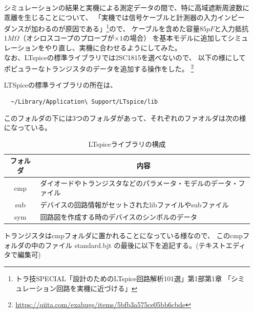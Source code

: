 \documentclass[uplatex,a4paper,11pt,oneside,openany]{jsbook}
\begin{document}
シミュレーションの結果と実機による測定データの間で、特に高域遮断周波数に乖離を生じることについて、
「実機では信号ケーブルと計測器の入力インピーダンスが加わるのが原因である」\footnote{トラ技SPECIAL「設計のためのLTspice回路解析101選」第1部第1章
「シミュレーション回路を実機に近づける」}ので、
ケーブルを含めた容量$85pF$と入力抵抗$1M\Omega$（オシロスコープのプローブが$\times 1$の場合）
を基本モデルに追加してシミュレーションをやり直し、実機に合わせるようにしてみた。\\

なお、LTspiceの標準ライブラリでは2SC1815を選べないので、
以下の様にしてポピュラーなトランジスタのデータを追加する操作をした。
\footnote{\url{https://qiita.com/exabugs/items/5bfb3a575ce05bb6cbde}}

LTSpiceの標準ライブラリの所在は、
\begin{verbatim}
  ~/Library/Application\ Support/LTspice/lib
\end{verbatim}
このフォルダの下には3つのフォルダがあって、それぞれのファオルダは次の様になっている。
\begin{table}[H]
  \begin{center}
  \caption{LTspiceライブラリの構成}
  \begin{tabular}{|c|l|} \hline
    \multicolumn{1}{|c|}{\textbf{フォルダ}} & \multicolumn{1}{c|}{\textbf{内容}} \\ \hline\hline
    cmp & ダイオードやトランジスタなどのパラメータ・モデルのデータ・ファイル \\ \hline
    sub & デバイスの回路情報がセットされたlibファイルやsubファイル \\ \hline
    sym & 回路図を作成する時のデバイスのシンボルのデータ \\ \hline
  \end{tabular}
  \end{center}
\end{table}
トランジスタはcmpフォルダに置かれることになっている様なので、
このcmpフォルダの中のファイル standard.bjt の最後に以下を追記する。(テキストエディタで編集可)
\end{document}
